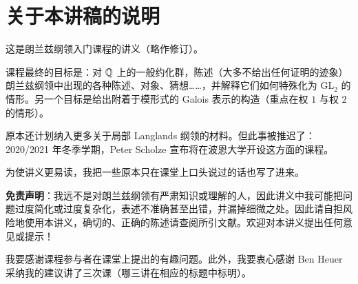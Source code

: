 \chapter{关于本讲稿的说明}

这是朗兰兹纲领入门课程的讲义（略作修订）。

课程最终的目标是：对 $\mathbb{Q}$ 上的一般约化群，陈述（大多不给出任何证明的迹象）朗兰兹纲领中出现的各种陈述、对象、猜想……，并解释它们如何特殊化为 $\mathrm{GL}_2$ 的情形。另一个目标是给出附着于模形式的 Galois 表示的构造（重点在权 $1$ 与权 $2$ 的情形）。

原本还计划纳入更多关于局部 Langlands 纲领的材料。但此事被推迟了：2020/2021 年冬季学期，Peter Scholze 宣布将在波恩大学开设这方面的课程。

为使讲义更易读，我把一些原本只在课堂上口头说过的话也写了进来。

\textbf{免责声明}：我远不是对朗兰兹纲领有严肃知识或理解的人，因此讲义中我可能把问题过度简化或过度复杂化，表述不准确甚至出错，并漏掉细微之处。因此请自担风险地使用本讲义，确切的、正确的陈述请查阅所引文献。欢迎对本讲义提出任何意见或提示！

我要感谢课程参与者在课堂上提出的有趣问题。此外，我要衷心感谢 Ben Heuer 采纳我的建议讲了三次课（哪三讲在相应的标题中标明）。
